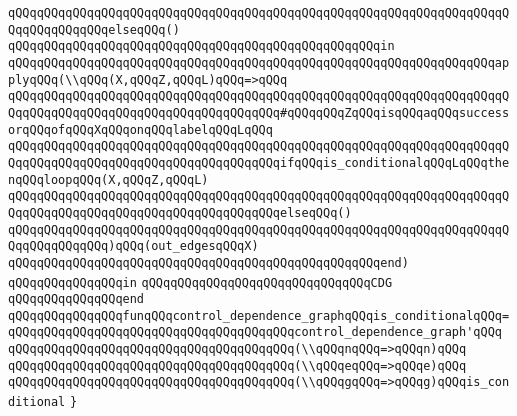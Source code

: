 \verb|qQQqqQQqqQQqqQQqqQQqqQQqqQQqqQQqqQQqqQQqqQQqqQQqqQQqqQQqqQQqqQQqqQQqqQQqqQQqqQQqqQQqelseqQQq()|\newline
\verb|qQQqqQQqqQQqqQQqqQQqqQQqqQQqqQQqqQQqqQQqqQQqqQQqqQQqin|\newline
\verb|qQQqqQQqqQQqqQQqqQQqqQQqqQQqqQQqqQQqqQQqqQQqqQQqqQQqqQQqqQQqqQQqqQQqapplyqQQq(\\qQQq(X,qQQqZ,qQQqL)qQQq=>qQQq|\newline
\verb|qQQqqQQqqQQqqQQqqQQqqQQqqQQqqQQqqQQqqQQqqQQqqQQqqQQqqQQqqQQqqQQqqQQqqQQqqQQqqQQqqQQqqQQqqQQqqQQqqQQqqQQqqQQq#qQQqqQQqZqQQqisqQQqaqQQqsuccessorqQQqofqQQqXqQQqonqQQqlabelqQQqLqQQq|\newline
\verb|qQQqqQQqqQQqqQQqqQQqqQQqqQQqqQQqqQQqqQQqqQQqqQQqqQQqqQQqqQQqqQQqqQQqqQQqqQQqqQQqqQQqqQQqqQQqqQQqqQQqqQQqqQQqifqQQqis_conditionalqQQqLqQQqthenqQQqloopqQQq(X,qQQqZ,qQQqL)|\newline
\verb|qQQqqQQqqQQqqQQqqQQqqQQqqQQqqQQqqQQqqQQqqQQqqQQqqQQqqQQqqQQqqQQqqQQqqQQqqQQqqQQqqQQqqQQqqQQqqQQqqQQqqQQqqQQqelseqQQq()|\newline
\verb|qQQqqQQqqQQqqQQqqQQqqQQqqQQqqQQqqQQqqQQqqQQqqQQqqQQqqQQqqQQqqQQqqQQqqQQqqQQqqQQqqQQq)qQQq(out_edgesqQQqX)|\newline
\verb|qQQqqQQqqQQqqQQqqQQqqQQqqQQqqQQqqQQqqQQqqQQqqQQqqQQqend)|\newline
\verb|qQQqqQQqqQQqqQQqin|\newline
\verb|qQQqqQQqqQQqqQQqqQQqqQQqqQQqqQQqCDG|\newline
\verb|qQQqqQQqqQQqqQQqend|\newline
\newline
\verb|qQQqqQQqqQQqqQQqfunqQQqcontrol_dependence_graphqQQqis_conditionalqQQq=|\newline
\verb|qQQqqQQqqQQqqQQqqQQqqQQqqQQqqQQqqQQqqQQqcontrol_dependence_graph'qQQq|\newline
\verb|qQQqqQQqqQQqqQQqqQQqqQQqqQQqqQQqqQQqqQQq(\\qQQqnqQQq=>qQQqn)qQQq|\newline
\verb|qQQqqQQqqQQqqQQqqQQqqQQqqQQqqQQqqQQqqQQq(\\qQQqeqQQq=>qQQqe)qQQq|\newline
\verb|qQQqqQQqqQQqqQQqqQQqqQQqqQQqqQQqqQQqqQQq(\\qQQqgqQQq=>qQQqg)qQQqis_conditional|\newline
\newline
\verb|}|\newline

